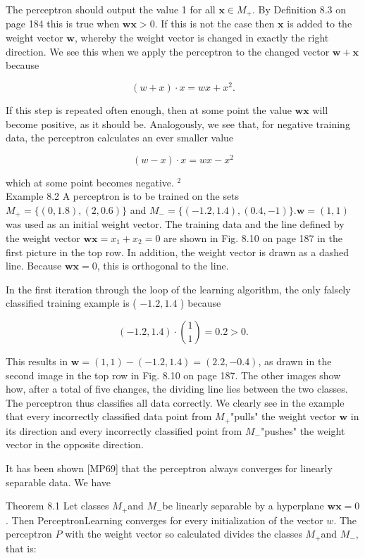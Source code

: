 \documentclass[10pt]{article}
\begin{document}
The perceptron should output the value 1 for all $\boldsymbol{x} \in M_{+}$. By Definition 8.3 on page 184 this is true when $\boldsymbol{w} \boldsymbol{x}>0$. If this is not the case then $\boldsymbol{x}$ is added to the weight vector $\boldsymbol{w}$, whereby the weight vector is changed in exactly the right direction. We see this when we apply the perceptron to the changed vector $\boldsymbol{w}+\boldsymbol{x}$ because

$$
(w+x) \cdot x=w x+x^{2} .
$$

If this step is repeated often enough, then at some point the value $\boldsymbol{w} \boldsymbol{x}$ will become positive, as it should be. Analogously, we see that, for negative training data, the perceptron calculates an ever smaller value

$$
(w-x) \cdot x=w x-x^{2}
$$

which at some point becomes negative. ${ }^{2}$\\
Example 8.2 A perceptron is to be trained on the sets $M_{+}=\{(0,1.8),(2,0.6)\}$ and $M_{-}=\{(-1.2,1.4),(0.4,-1)\} . \boldsymbol{w}=(1,1)$ was used as an initial weight vector. The training data and the line defined by the weight vector $\boldsymbol{w} \boldsymbol{x}=x_{1}+x_{2}=0$ are shown in Fig. 8.10 on page 187 in the first picture in the top row. In addition, the weight vector is drawn as a dashed line. Because $\boldsymbol{w} \boldsymbol{x}=0$, this is orthogonal to the line.

In the first iteration through the loop of the learning algorithm, the only falsely classified training example is ( $-1.2,1.4$ ) because

$$
(-1.2,1.4) \cdot\binom{1}{1}=0.2>0 .
$$

This results in $\boldsymbol{w}=(1,1)-(-1.2,1.4)=(2.2,-0.4)$, as drawn in the second image in the top row in Fig. 8.10 on page 187. The other images show how, after a total of five changes, the dividing line lies between the two classes. The perceptron thus classifies all data correctly. We clearly see in the example that every incorrectly classified data point from $M_{+}$"pulls" the weight vector $\boldsymbol{w}$ in its direction and every incorrectly classified point from $M_{-}$"pushes" the weight vector in the opposite direction.

It has been shown [MP69] that the perceptron always converges for linearly separable data. We have

Theorem 8.1 Let classes $M_{+}$and $M_{-}$be linearly separable by a hyperplane $\boldsymbol{w} \boldsymbol{x}=0$. Then PerceptronLearning converges for every initialization of the vector $w$. The perceptron $P$ with the weight vector so calculated divides the classes $M_{+}$and $M_{-}$, that is:
\end{document}
